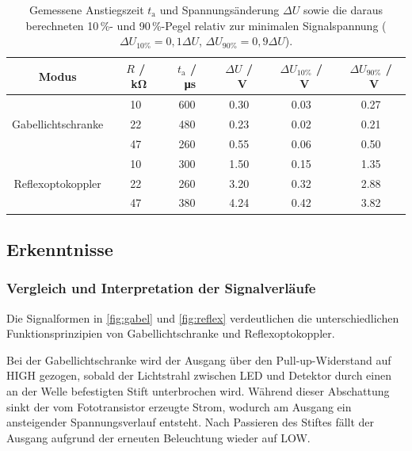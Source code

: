 \begin{table}[h]
	\centering
	\begin{tabular}{c|c|c|c|c|c}
		\hline
		Modus & $R$ / \SI{}{\kilo\ohm}    & $t_\text{a}$ / \SI{}{\micro\second}
		      & $\Delta U$ / \SI{}{\volt} & $\Delta U_{10\%}$ / \SI{}{\volt}    & $\Delta U_{90\%}$ / \SI{}{\volt}               \\
		\hline
		\multirow{3}{*}{Gabellichtschranke}
		      & 10                        & 600                                 & 0.30                             & 0.03 & 0.27 \\
		      & 22                        & 480                                 & 0.23                             & 0.02 & 0.21 \\
		      & 47                        & 260                                 & 0.55                             & 0.06 & 0.50 \\
		\hline
		\multirow{3}{*}{Reflexoptokoppler}
		      & 10                        & 300                                 & 1.50                             & 0.15 & 1.35 \\
		      & 22                        & 260                                 & 3.20                             & 0.32 & 2.88 \\
		      & 47                        & 380                                 & 4.24                             & 0.42 & 3.82 \\
		\hline
	\end{tabular}
	\caption{Gemessene Anstiegszeit $t_\text{a}$ und Spannungsänderung
	$\Delta U$ sowie die daraus berechneten 10\,\%- und 90\,\%-Pegel
	relativ zur minimalen Signalspannung ($\Delta U_{10\%}=0{,}1\Delta U$,
	$\Delta U_{90\%}=0{,}9\Delta U$).}
	\label{tab:30_ta}
\end{table}

\subsection{Erkenntnisse}

\subsubsection{Vergleich und Interpretation der Signalverläufe}

Die Signalformen in \autoref{fig:gabel} und \autoref{fig:reflex} verdeutlichen die unterschiedlichen Funktionsprinzipien von Gabellichtschranke und Reflexoptokoppler.

Bei der Gabellichtschranke wird der Ausgang über den Pull-up-Widerstand auf HIGH gezogen, sobald der Lichtstrahl zwischen LED und Detektor durch einen an der Welle befestigten Stift unterbrochen wird. Während dieser Abschattung sinkt der vom Fototransistor erzeugte Strom, wodurch am Ausgang ein ansteigender Spannungsverlauf entsteht. Nach Passieren des Stiftes fällt der Ausgang aufgrund der erneuten Beleuchtung wieder auf LOW.

